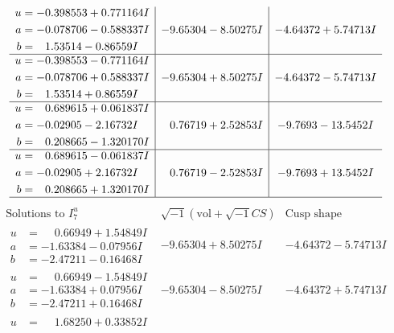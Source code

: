 \documentclass[1p]{elsarticle_modified}
\theoremstyle{definition}
\newcommand{\I}{\sqrt{-1}}
\begin{document}
$$\begin{array}{c|c|c}
\begin{aligned}
u &= -0.398553 + 0.771164 I \\
a &= -0.078706 - 0.588337 I \\
b &= \phantom{-}1.53514 - 0.86559 I\end{aligned}
 & -9.65304 - 8.50275 I & -4.64372 + 5.74713 I \\ \hline\begin{aligned}
u &= -0.398553 - 0.771164 I \\
a &= -0.078706 + 0.588337 I \\
b &= \phantom{-}1.53514 + 0.86559 I\end{aligned}
 & -9.65304 + 8.50275 I & -4.64372 - 5.74713 I \\ \hline\begin{aligned}
u &= \phantom{-}0.689615 + 0.061837 I \\
a &= -0.02905 - 2.16732 I \\
b &= \phantom{-}0.208665 - 1.320170 I\end{aligned}
 & \phantom{-}0.76719 + 2.52853 I & -9.7693 - 13.5452 I \\ \hline\begin{aligned}
u &= \phantom{-}0.689615 - 0.061837 I \\
a &= -0.02905 + 2.16732 I \\
b &= \phantom{-}0.208665 + 1.320170 I\end{aligned}
 & \phantom{-}0.76719 - 2.52853 I & -9.7693 + 13.5452 I\\
 \hline 
 \end{array}$$\newpage$$\begin{array}{c|c|c}  
\text{Solutions to }I^u_{7}& \I (\text{vol} + \sqrt{-1}CS) & \text{Cusp shape}\\
 \hline 
\begin{aligned}
u &= \phantom{-}0.66949 + 1.54849 I \\
a &= -1.63384 - 0.07956 I \\
b &= -2.47211 - 0.16468 I\end{aligned}
 & -9.65304 + 8.50275 I & -4.64372 - 5.74713 I \\ \hline\begin{aligned}
u &= \phantom{-}0.66949 - 1.54849 I \\
a &= -1.63384 + 0.07956 I \\
b &= -2.47211 + 0.16468 I\end{aligned}
 & -9.65304 - 8.50275 I & -4.64372 + 5.74713 I \\ \hline\begin{aligned}
u &= \phantom{-}1.68250 + 0.33852 I \\

\end{aligned}
\end{array}$$
\end{document}
